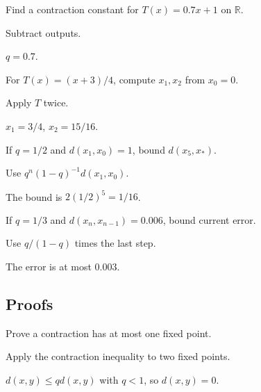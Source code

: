 \begin{exercise}\label{exr:ii16-expand-02}
Find a contraction constant for \(T(x)=0.7x+1\) on \(\mathbb R\).
\end{exercise}
\begin{hint}
Subtract outputs.
\end{hint}
\begin{solution}
\(q=0.7\).
\end{solution}

\begin{exercise}\label{exr:ii16-expand-03}
For \(T(x)=(x+3)/4\), compute \(x_1,x_2\) from \(x_0=0\).
\end{exercise}
\begin{hint}
Apply \(T\) twice.
\end{hint}
\begin{solution}
\(x_1=3/4\), \(x_2=15/16\).
\end{solution}

\begin{exercise}\label{exr:ii16-expand-04}
If \(q=1/2\) and \(d(x_1,x_0)=1\), bound \(d(x_5,x_*)\).
\end{exercise}
\begin{hint}
Use \(q^n(1-q)^{-1}d(x_1,x_0)\).
\end{hint}
\begin{solution}
The bound is \(2(1/2)^5=1/16\).
\end{solution}

\begin{exercise}\label{exr:ii16-expand-05}
If \(q=1/3\) and \(d(x_n,x_{n-1})=0.006\), bound current error.
\end{exercise}
\begin{hint}
Use \(q/(1-q)\) times the last step.
\end{hint}
\begin{solution}
The error is at most \(0.003\).
\end{solution}

\subsection*{Proofs}

\begin{exercise}\label{exr:ii16-expand-06}
Prove a contraction has at most one fixed point.
\end{exercise}
\begin{hint}
Apply the contraction inequality to two fixed points.
\end{hint}
\begin{solution}
\(d(x,y)\le qd(x,y)\) with \(q<1\), so \(d(x,y)=0\).
\end{solution}

